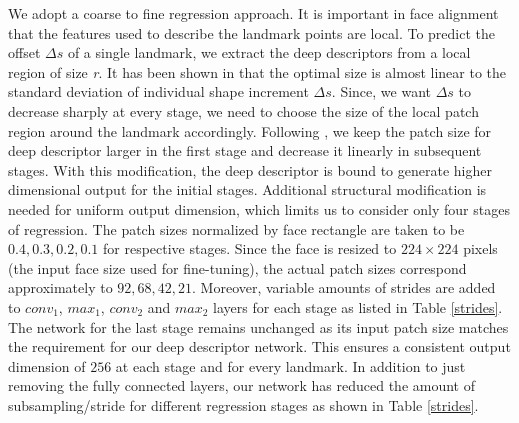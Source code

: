 \documentclass[10pt,twocolumn,letterpaper]{article}
\begin{document}
We adopt a coarse to fine regression approach. It is important in face alignment that the features used to describe the landmark points are local. To predict the offset $ \Delta\textit{s}$ of a single landmark, we extract the deep descriptors from a local region of size \textit{r}. It has been shown in \cite{DBLP:conf/cvpr/RenCW014} that the optimal size is almost linear to the standard deviation of individual shape increment $\Delta\textit{s}$. Since, we want $\Delta\textit{s}$ to decrease sharply at every stage, we need to choose the size of the local patch region around the landmark accordingly. Following \cite{DBLP:conf/cvpr/RenCW014}, we keep the patch size for deep descriptor larger in the first stage and decrease it linearly in subsequent stages. With this modification, the deep descriptor is bound to generate higher dimensional output for the initial stages. Additional structural modification is needed for uniform output dimension, which limits us to consider only four stages of regression. The patch sizes normalized by face rectangle are taken to be ${0.4, 0.3, 0.2, 0.1}$ for respective stages. Since the face is resized to $224 \times 224$ pixels (the input face size used for fine-tuning), the actual patch sizes correspond approximately to ${92, 68, 42, 21}$. Moreover, variable amounts of strides are added to $conv_1$, $max_1$, $conv_2$ and $max_2$ layers for each stage as listed in Table \ref{strides}. The network for the last stage remains unchanged as its input patch size matches the requirement for our deep descriptor network. This ensures a consistent output dimension of $256$ at each stage and for every landmark. In addition to just removing the fully connected layers, our network has reduced the amount of subsampling/stride for different regression stages as shown in Table \ref{strides}.

\begin{table}[htp!]
\begin{center}
\vskip 4pt
\caption{Input size and the number of strides in conv1, max1, conv2 and max2 layers for 4 stages of regression.} \label{strides}
\end{center}
\end{table}
\end{document}
